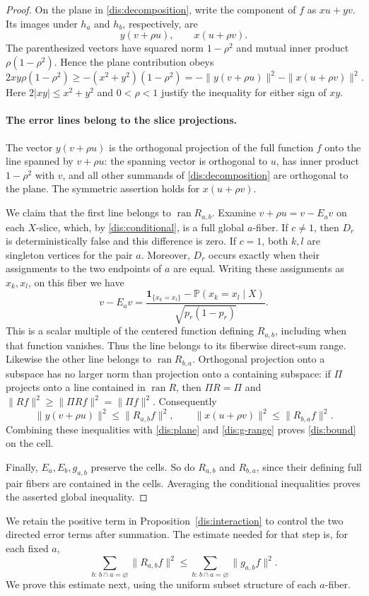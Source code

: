 \begin{proof}
On the plane in \eqref{dis:decomposition}, write the component of
$f$ as $xu+yv$. Its images under $h_a$ and $h_b$, respectively, are
\[
 y(v+\rho u),\qquad x(u+\rho v).
\]
The parenthesized vectors have squared norm $1-\rho^2$ and mutual
inner product $\rho(1-\rho^2)$. Hence the plane contribution obeys
\begin{equation}\label{dis:plane}
 2xy\rho(1-\rho^2)
 \ge -(x^2+y^2)(1-\rho^2)
 =-\|y(v+\rho u)\|^2-\|x(u+\rho v)\|^2.
\end{equation}
Here $2|xy|\le x^2+y^2$ and $0<\rho<1$ justify the inequality
for either sign of $xy$.

\paragraph{The error lines belong to the slice projections.}
The vector $y(v+\rho u)$ is the orthogonal projection of the full
function $f$ onto the line spanned by $v+\rho u$: the spanning vector is
orthogonal to $u$, has inner product $1-\rho^2$ with $v$, and
all other summands of \eqref{dis:decomposition} are orthogonal to
the plane. The symmetric assertion holds for $x(u+\rho v)$.

We claim that the first line belongs to
$\operatorname{ran}R_{a,b}$. Examine
$v+\rho u=v-E_a v$ on each $X$-slice, which, by
\eqref{dis:conditional}, is a full global $a$-fiber. If $c\ne1$,
then $D_r$ is deterministically false and this difference is zero.
If $c=1$, both $k,l$ are singleton vertices for the pair $a$.
Moreover, $D_r$ occurs exactly when their assignments to the two
endpoints of $a$ are equal. Writing these assignments as $x_k,x_l$,
on this fiber we have
\[
 v-E_a v=
 \frac{\mathbf 1_{\{x_k=x_l\}}-
       \mathbb P(x_k=x_l\mid X)}{\sqrt{p_r(1-p_r)}}.
\]
This is a scalar multiple of the centered function defining
$R_{a,b}$, including when that function vanishes. Thus the line
belongs to its fiberwise direct-sum range. Likewise the other line
belongs to $\operatorname{ran}R_{b,a}$. Orthogonal projection onto
a subspace has no larger norm than projection onto a containing
subspace: if $\Pi$ projects onto a line contained in
$\operatorname{ran}R$, then $\Pi R=\Pi$ and
$\|Rf\|^2\ge\|\Pi Rf\|^2=\|\Pi f\|^2$. Consequently
\[
 \|y(v+\rho u)\|^2\le\|R_{a,b}f\|^2,\qquad
 \|x(u+\rho v)\|^2\le\|R_{b,a}f\|^2.
\]
Combining these inequalities with \eqref{dis:plane} and
\eqref{dis:g-range} proves \eqref{dis:bound} on the cell.

Finally, $E_a,E_b,g_{a,b}$ preserve the cells. So do $R_{a,b}$ and
$R_{b,a}$, since their defining full pair fibers are contained in
the cells. Averaging the conditional inequalities proves the
asserted global inequality.
\end{proof}

We retain the positive term in Proposition~\ref{dis:interaction} to
control the two directed error terms after summation. The estimate needed for that step is, for each fixed $a$,
\[
 \sum_{b:\,b\cap a=\varnothing}\|R_{a,b}f\|^2
 \le \sum_{b:\,b\cap a=\varnothing}\|g_{a,b}f\|^2.
\]
We prove this estimate next, using the uniform subset structure of
each $a$-fiber.
